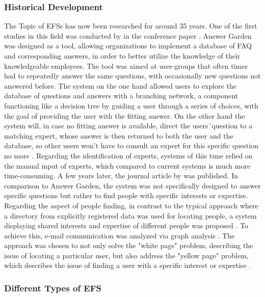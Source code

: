 \subsubsection{Historical Development}
The Topic of \acp{EFS} has now been researched for around 35 years. One of the first studies in this field was conducted by \textcite{ackerman_answer_1990} in the conference paper . Answer Garden was designed as a tool, allowing organizations to implement a database of \ac{FAQ} and corresponding answers, in order to better utilize the knowledge of their knowledgeable employees. The tool was aimed at user-groups that often times had to repeatedly answer the same questions, with occasionally new questions not answered before. The system on the one hand allowed users to explore the database of questions and answers with a branching network, a component functioning like a decision tree by guiding a user through a series of choices, with the goal of providing the user with the fitting answer. On the other hand the system will, in case no fitting answer is available, direct the users´question to a matching expert, whose answer is then returned to both the user and the database, so other users won't have to consult an expert for this specific question no more \parencite[1,3]{ackerman_answer_1990}. Regarding the identification of experts, systems of this time relied on the manual input of experts, which compared to current systems is much more time-consuming.
A few years later, the journal article  by \textcite{schwartz_discovering_1993} was published. In comparison to Answer Garden, the system was not specifically designed to answer specific questions but rather to find people with specific interests or expertise. Regarding the aspect of people finding, in contrast to the typical approach where a directory from explicitly registered data was used for locating people, a system displaying shared interests and expertise of different people was proposed \parencite[1-2]{schwartz_discovering_1993}. To achieve this, e-mail communication was analyzed via graph analysis \parencite[9]{schwartz_discovering_1993}. The approach was chosen to not only solve the "white page" problem, describing the issue of locating a particular user, but also address the "yellow page" problem, which describes the issue of finding a user with a specific interest or expertise \parencite[1]{schwartz_discovering_1993}.\\


\subsubsection{Different Types of \acl{EFS}}
